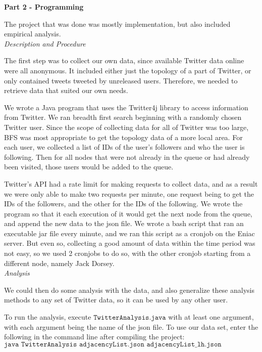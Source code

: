 \documentclass[letterpaper]{article}
\begin{document}
\pagestyle{fancy}
\textbf{Part 2 - Programming}

The project that was done was mostly implementation, but also included empirical analysis.\\

\noindent\textit{Description and Procedure}

The first step was to collect our own data, since available Twitter data online were all anonymous. It included either just the topology of a part of Twitter, or only contained tweets tweeted by unreleased users. Therefore, we needed to retrieve data that suited our own needs.

We wrote a Java program that uses the Twitter4j library to access information from Twitter. We ran breadth first search beginning with a randomly chosen Twitter user. Since the scope of collecting data for all of Twitter was too large, BFS was most appropriate to get the topology data of a more local area. For each user, we collected a list of IDs of the user's followers and who the user is following. Then for all nodes that were not already in the queue or had already been visited, those users would be added to the queue.

Twitter's API had a rate limit for making requests to collect data, and as a result we were only able to make two requests per minute, one request being to get the IDs of the followers, and the other for the IDs of the following. We wrote the program so that it each execution of it would get the next node from the queue, and append the new data to the json file. We wrote a bash script that ran an executable jar file every minute, and we ran this script as a cronjob on the Eniac server. But even so, collecting a good amount of data within the time period was not easy, so we used 2 cronjobs to do so, with the other cronjob starting from a different node, namely Jack Dorsey.\\

\noindent\textit{Analysis}

We could then do some analysis with the data, and also generalize these analysis methods to any set of Twitter data, so it can be used by any other user.

To run the analysis, execute $\texttt{TwitterAnalysis.java}$ with at least one argument, with each argument being the name of the json file. To use our data set, enter the following in the command line after compiling the project: $\texttt{java TwitterAnalysis adjacencyList.json adjacencyList\_lh.json}$\\
\end{document}
